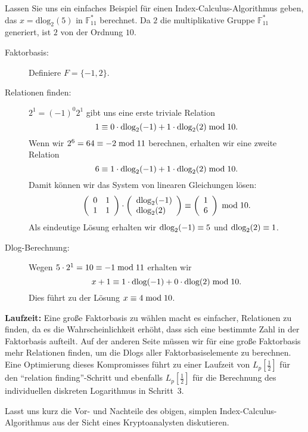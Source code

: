 \begin{refsegment}
Lassen Sie uns ein einfaches Beispiel für einen Index-Calculus-Algorithmus geben, das $x=\textrm{dlog}_2(5)$ in $\mathbb{F}_{11}^*$ berechnet. Da $2$ die multiplikative Gruppe $\mathbb{F}_{11}^*$ generiert, ist $2$ von der Ordnung $10$.

\begin{description}
\item[Faktorbasis:] Definiere $F=\{-1,2\}$.

\item[Relationen finden:] $2^1 = (-1)^0 2^1$ gibt uns eine erste triviale Relation
$$
  1 \equiv 0 \cdot \textrm{dlog}_2(-1) + 1\cdot \textrm{dlog}_2(2) \hspace{1mm}{\rm mod}\hspace{1mm} 10.
$$
Wenn wir $2^6 = 64 \equiv -2 \hspace{1mm}{\rm mod}\hspace{1mm} 11$ berechnen, erhalten wir eine zweite Relation
$$
  6 \equiv 1\cdot \textrm{dlog}_2(-1) + 1 \cdot \textrm{dlog}_2(2) \hspace{1mm}{\rm mod}\hspace{1mm} 10.
$$
Damit können wir das System von linearen Gleichungen lösen:
$$
\left(
\begin{array}{ll}
0 & 1\\
1 & 1
\end{array}
\right)
\cdot
\left(
\begin{array}{l}
\dlog_2(-1)\\
\dlog_2(2)
\end{array}
\right)
%
\equiv
%
\left(
\begin{array}{l}
1\\
6
\end{array}
\right) \mmod 10.
$$
Als eindeutige Lösung erhalten wir $\textrm{dlog}_2(-1) \equiv 5$ und $\textrm{dlog}_2(2) \equiv 1$.

\item[Dlog-Berechnung:] Wegen $5 \cdot 2^{1} = 10 \equiv -1 \hspace{1mm}{\rm mod}\hspace{1mm} 11$ erhalten wir
$$
  x + 1 \equiv 1 \cdot \textrm{dlog}(-1) + 0 \cdot \textrm{dlog}(2) \hspace{1mm}{\rm mod}\hspace{1mm} 10.
$$
Dies führt zu der Lösung $x \equiv 4 \hspace{1mm}{\rm mod}\hspace{1mm} 10$.
\end{description}

\noindent \textbf{Laufzeit:}
Eine große Faktorbasis zu wählen macht es einfacher, Relationen zu finden, da es die Wahrscheinlichkeit erhöht, dass sich eine bestimmte Zahl in der Faktorbasis aufteilt. Auf der anderen Seite müssen wir für eine große Faktorbasis mehr Relationen finden, um die Dlogs aller Faktorbasiselemente zu berechnen. Eine Optimierung dieses Kompromisses führt zu einer Laufzeit von $L_p[\frac 1 2]$ für den "`relation finding"'-Schritt und ebenfalls $L_p[\frac 1 2]$ für die Berechnung des individuellen diskreten Logarithmus in Schritt~3.

Lasst uns kurz die Vor- und Nachteile des obigen, simplen Index-Calculus-Algorithmus aus der Sicht eines Kryptoanalysten diskutieren.


\end{refsegment}
